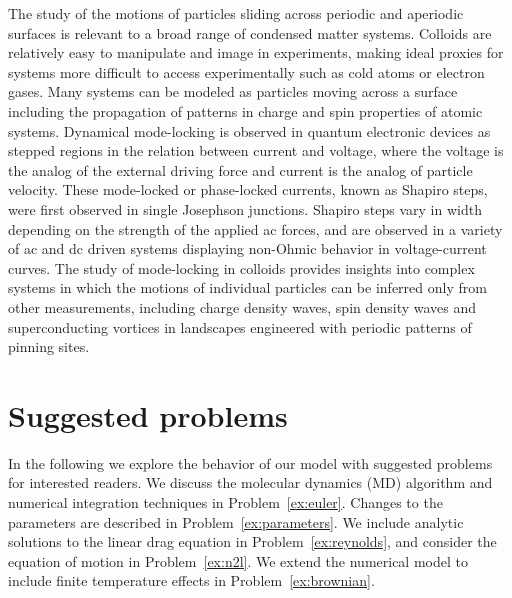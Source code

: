 \documentclass[preprint,showpacs,preprintnumbers,amsmath,amssymb,aps,prb]{revtex4-1}
\theoremstyle{remark}
\begin{document}
The study of the motions of particles 
sliding across periodic and aperiodic surfaces 
is relevant 
to a broad range of condensed matter systems.
Colloids are 
relatively easy to 
manipulate and image in experiments,
making ideal proxies 
for systems
more difficult to access experimentally 
such as cold atoms or electron gases.\cite{Grier2003}
Many systems can be modeled
as particles moving across a surface
including 
the propagation of patterns
in charge and spin properties of atomic systems.
Dynamical mode-locking 
is 
observed in  
quantum electronic
devices as 
stepped regions in the relation between current and voltage,
where the voltage is the analog of the external driving force
and current is the analog of particle velocity.
These mode-locked or phase-locked currents, known as Shapiro steps,
were first
observed in single Josephson junctions.\cite{Shapiro1963, Golubov2004}
Shapiro steps vary in width depending on the strength of the
applied ac forces,
and are observed in a variety of ac and dc driven systems
displaying
non-Ohmic behavior in voltage-current curves.
The study of 
mode-locking in colloids provides insights
into 
complex %
systems in which 
the motions of individual particles can  be inferred only
from other measurements, 
including
charge density waves, spin density waves
and superconducting vortices in landscapes 
engineered with periodic patterns of pinning sites.\cite{Reichhardt2000}

\section{Suggested problems}
\label{sec:problems}	

In the following
we explore the behavior of our model
with suggested problems for interested readers.
We discuss the molecular dynamics (MD) algorithm
and
numerical integration techniques in Problem~\ref{ex:euler}.
Changes to the parameters are described in 
Problem~\ref{ex:parameters}.
We include analytic solutions to  the 
linear drag equation in Problem~\ref{ex:reynolds}, and consider
the equation of motion in Problem~\ref{ex:n2l}.
We extend the numerical model  
to include finite temperature effects
in Problem~\ref{ex:brownian}.
\end{document}
